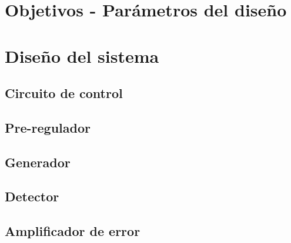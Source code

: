 



\tableofcontents
\newpage

\section{Objetivos - Par\'ametros del dise\~no}

\section{Dise\~no del sistema}
\subsection{Circuito de control}

\subsection{Pre-regulador}

\subsection{Generador}

\subsection{Detector}

\subsection{Amplificador de error}

